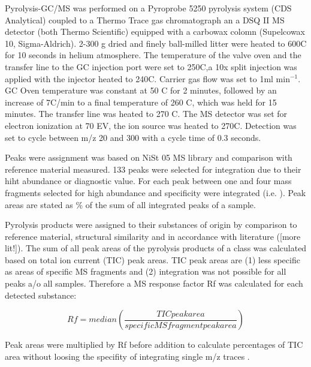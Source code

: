 \documentclass[preprint,review,12pt]{elsarticle}
\begin{document}
Pyrolysis-GC/MS was performed on a Pyroprobe 5250 pyrolysis system (CDS Analytical) coupled to a Thermo Trace gas chromatograph an a DSQ II MS detector (both Thermo Scientific) equipped with a carbowax colomn (Supelcowax 10, Sigma-Aldrich). 2-300 \textmu g dried and finely ball-milled litter were heated to 600\textdegree C for 10 seconds in helium atmosphere. The temperature of the valve oven and the transfer line to the GC injection port were set to 250\textdegree C,a 10x split injection was applied with the injector heated to 240\textdegree C. Carrier gas flow was set to 1ml min$^{-1}$. GC Oven temperature was constant at 50 \textdegree C for 2 minutes, followed by an increase of 7\textdegree C/min to a final temperature of 260 \textdegree C, which was held for 15 minutes. The transfer line was heated to 270 \textdegree C. The MS detector was set for electron ionization at 70 EV, the ion source was heated to 270\textdegree C. Detection was set to cycle between m/z 20 and 300 with a cycle time of 0.3 seconds.

Peaks were assignment was based on NiSt 05 MS library and comparison with reference material measured. 133 peaks were selected for integration due to their hiht abundance or diagnostic value. For each peak between one and four mass fragments selected for high abundance and specificity were integrated (i.e. \cite{Schellekens2009}). Peak areas are stated as \% of the sum of all integrated peaks of a sample. 

Pyrolysis products were assigned to their substances of origin by comparison to reference material, structural similarity and in accordance with literature (\cite{Ralph1991a, Schellekens2009, Chiavari1992}[more lit!]). The sum of all peak areas of the pyrolysis products of a class was calculated based on total ion current (TIC) peak areas. TIC peak areas are (1) less specific as areas of specific MS fragments and (2) integration was not possible for all peaks a/o all samples. Therefore a MS response factor Rf was calculated for each detected substance:

\begin{equation}
Rf = median (\frac{TIC peak area}{specific MS fragment peak area})
\end{equation}

Peak areas were multiplied by Rf before addition to calculate percentages of TIC area without loosing the specifity of integrating single m/z traces \citep{Kuder1998}.

\end{document}
